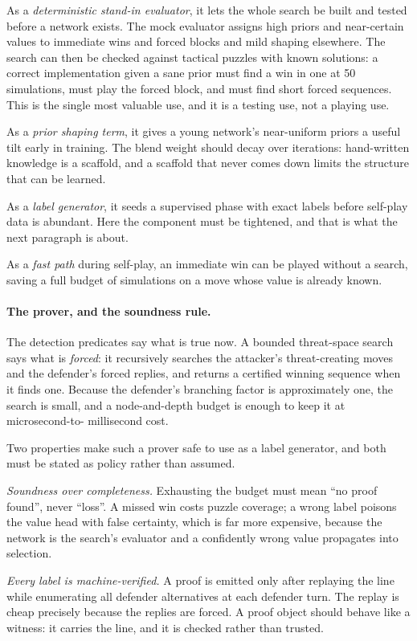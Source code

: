 As a \emph{deterministic stand-in evaluator}, it lets the whole search be built
and tested before a network exists. The mock evaluator assigns high priors and
near-certain values to immediate wins and forced blocks and mild shaping
elsewhere. The search can then be checked against tactical puzzles with known
solutions: a correct implementation given a sane prior must find a win in one at
50 simulations, must play the forced block, and must find short forced sequences.
This is the single most valuable use, and it is a testing use, not a playing use.

As a \emph{prior shaping term}, it gives a young network's near-uniform priors a
useful tilt early in training. The blend weight should decay over iterations:
hand-written knowledge is a scaffold, and a scaffold that never comes down limits
the structure that can be learned.

As a \emph{label generator}, it seeds a supervised phase with exact labels before
self-play data is abundant. Here the component must be tightened, and that is
what the next paragraph is about.

As a \emph{fast path} during self-play, an immediate win can be played without a
search, saving a full budget of simulations on a move whose value is already
known.

\paragraph{The prover, and the soundness rule.} The detection predicates say what
is true now. A bounded threat-space search says what is \emph{forced}: it
recursively searches the attacker's threat-creating moves and the defender's
forced replies, and returns a certified winning sequence when it finds one.
Because the defender's branching factor is approximately one, the search is
small, and a node-and-depth budget is enough to keep it at microsecond-to-
millisecond cost.

Two properties make such a prover safe to use as a label generator, and both must
be stated as policy rather than assumed.

\emph{Soundness over completeness.} Exhausting the budget must mean ``no proof
found'', never ``loss''. A missed win costs puzzle coverage; a wrong label
poisons the value head with false certainty, which is far more expensive, because
the network is the search's evaluator and a confidently wrong value propagates
into selection.

\emph{Every label is machine-verified.} A proof is emitted only after replaying
the line while enumerating all defender alternatives at each defender turn. The
replay is cheap precisely because the replies are forced. A proof object should
behave like a witness: it carries the line, and it is checked rather than
trusted.

